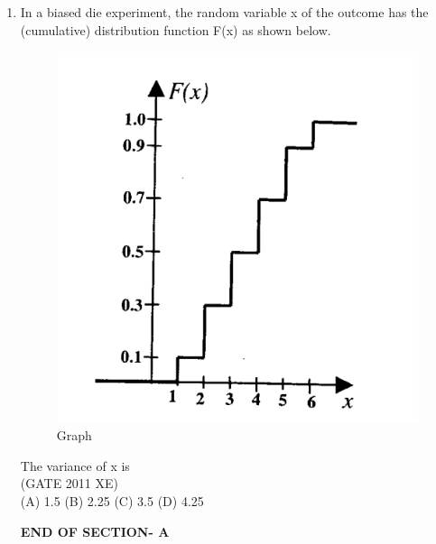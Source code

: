 \documentclass[journal,12pt,onecolumn]{IEEEtran}
\begin{document}
\begin{enumerate}
\item In a biased die experiment, the random variable x of the outcome has the (cumulative) distribution function F(x) as shown below.

\begin{figure}[htbp]
  \centering
  \includegraphics[width=.6\columnwidth]{figs/A/fig1.png}
  \caption{Graph}
  \label{fig:figs/A/fig1.png}
\end{figure}


The variance of x is\\

\hfill{(GATE 2011 XE)} \\
(A) 1.5 
(B) 2.25 
(C) 3.5   
(D) 4.25   

\vspace{3\baselineskip}
    \begin{center}
    \textbf{\Large END OF SECTION- A}
    \end{center}

\end{enumerate}


\newpage
\end{document}
